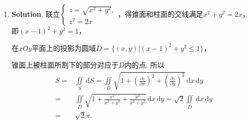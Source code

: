 \documentclass[../main.tex]{subfiles}
\begin{document}
\begin{enumerate}
    \item \textbf{Solution}. 联立$\begin{cases}
                  z=\sqrt{x^2+y^2}, \\
                  z^{2}=2x
              \end{cases}$，得锥面和柱面的交线满足$x^{2}+y^{2}=2x$，即$(x-1)^{2}+y^{2}=1$，

          在$xOy$平面上的投影为圆域$D=\{(x,y)|(x-1)^{2}+y^{2}\leq 1\}$，

          锥面上被柱面所割下的部分对应于$D$内的点. 所以
          \[
              \begin{aligned}
                  S = {} & \iint\limits_{S}\,\mathrm{d}S = \iint\limits_{D}\sqrt{1+\left(\frac{\partial z}{\partial x}\right)^2+\left(\frac{\partial z}{\partial y}\right)^2}\,\mathrm{d}x\,\mathrm{d}y \\
                  = {}   & \iint\limits_{D}\sqrt{1+\frac{x^2}{x^2+y^2}+\frac{y^2}{x^2+y^2}}\,\mathrm{d}x\,\mathrm{d}y = \sqrt{2}\iint\limits_{D}\,\mathrm{d}x\,\mathrm{d}y                              \\
                  = {}   & \sqrt{2}\pi.
              \end{aligned}
          \]

\end{enumerate}
\end{document}
